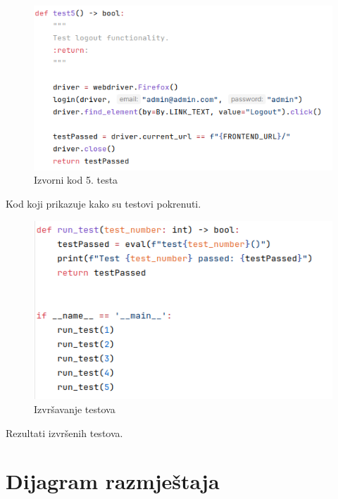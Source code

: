 			\begin{figure}[H]
				\includegraphics[width=\textwidth]{slike/selenium_test5.png}
				\centering
				\caption{Izvorni kod 5. testa}
				\label{fig:izvorni-kod-testa-5}
			\end{figure}
		
			Kod koji prikazuje kako su testovi pokrenuti.
			
			\begin{figure}[H]
				\includegraphics[width=\textwidth]{slike/selenium_running.png}
				\centering
				\caption{Izvršavanje testova}
				\label{fig:izvrsavanje-testova}
			\end{figure}
		
			Rezultati izvršenih testova.
				
			
			
			
			\eject 
		
		
		\section{Dijagram razmještaja}
			
